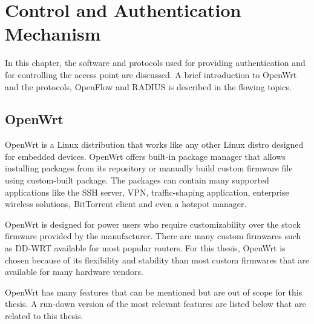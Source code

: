 
\chapter{Control and Authentication Mechanism}\label{ch:control_and_authentication}
\sffamily{}

In this chapter, the software and protocols used for providing authentication and for controlling the access point are discussed. A brief introduction to OpenWrt and the protocols, OpenFlow and RADIUS is described in the flowing topics.
\section{OpenWrt \cite{WhatIsOpenWrt}} \label{OpenWrt}

OpenWrt is a Linux distribution that works like any other Linux distro designed for embedded devices. OpenWrt offers built-in package manager that allows installing packages from its repository or manually build custom firmware file using custom-built package. The packages can contain many supported applications like the \gls{SSH} server, VPN, traffic-shaping application, enterprise wireless solutions, BitTorrent client and even a hotspot manager.

OpenWrt is designed for power users who require customizability over the stock firmware provided by the manufacturer. There are many custom firmwares such as DD-WRT available for most popular routers. For this thesis, OpenWrt is chosen because of its flexibility and stability than most custom firmwares that are available for many hardware vendors.

OpenWrt has many features that can be mentioned but are out of scope for this thesis. A run-down version of the most relevant features are listed below that are related to this thesis.

